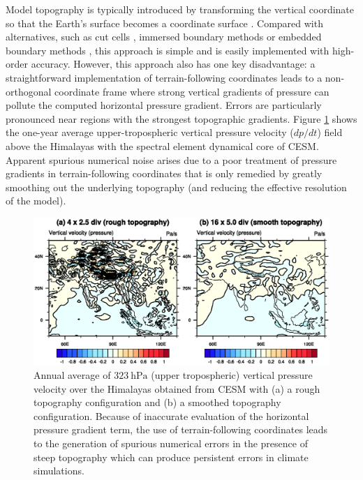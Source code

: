\documentclass[11pt]{article}
\begin{document}
Model topography is typically introduced by transforming the vertical coordinate so that the Earth's surface becomes a coordinate surface \cite{TGCRCJS1975JCP, schar2002new}.  Compared with alternatives, such as cut cells \cite{causon2000calculation, ingram2003developments}, immersed boundary methods \cite{mittal2005immersed} or embedded boundary methods \cite{johansen1998cartesian, wang2011algorithms}, this approach is simple and is easily implemented with high-order accuracy.  However, this approach also has one key disadvantage:  a straightforward implementation of terrain-following coordinates leads to a non-orthogonal coordinate frame where strong vertical gradients of pressure can pollute the computed horizontal pressure gradient.  Errors are particularly pronounced near regions with the strongest topographic gradients.  Figure \ref{fig:OmegaNoise} shows the one-year average upper-tropospheric vertical pressure velocity ($dp/dt$) field above the Himalayas with the spectral element dynamical core of CESM.  Apparent spurious numerical noise arises due to a poor treatment of pressure gradients in terrain-following coordinates that is only remedied by greatly smoothing out the underlying topography (and reducing the effective resolution of the model).

\begin{figure}[t]
\begin{center}
\includegraphics[width=5in, clip=true, trim=0cm 5.1cm 0cm 4.6cm]{OmegaNoise.eps}
\end{center}
\caption{Annual average of $323\ \mbox{hPa}$ (upper tropospheric) vertical pressure velocity over the Himalayas obtained from CESM with (a) a rough topography configuration and (b) a smoothed topography configuration. Because of inaccurate evaluation of the horizontal pressure gradient term, the use of terrain-following coordinates leads to the generation of spurious numerical errors in the presence of steep topography which can produce persistent errors in climate simulations.} \label{fig:OmegaNoise}
\end{figure}
\end{document}
